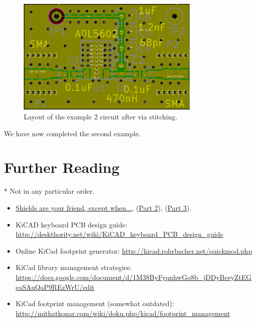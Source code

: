 \documentclass[12pt,letterpaper]{scrartcl}
\begin{document}
\begin{enumerate}
		\begin{figure}[ht]
			\centering
			\includegraphics[width=3.5in]{example2-layout-via}
			\caption{Layout of the example 2 circuit after via stitching.}
			\label{fig:example2-layout-via}
		\end{figure}
		
	\end{enumerate}

We have now completed the second example. 

\newpage
\section{Further Reading}

* Not in any particular order. 

\begin{itemize}
	\item \href{http://www.edn.com/electronics-blogs/the-practicing-instrumentation-engineer/4418080/2/Shields-are-your-friend--except-when-}{Shields are your friend, except when...}, (\href{http://www.edn.com/electronics-blogs/the-practicing-instrumentation-engineer/4419228/2/Shields-are-your-friend--except-when---Part-2-}{Part 2}), (\href{http://www.edn.com/electronics-blogs/the-practicing-instrumentation-engineer/4420553/Shields-are-your-friend--except-when---Part-3-}{Part 3}).
	
	\item KiCAD keyboard PCB design guide: \url{http://deskthority.net/wiki/KiCAD_keyboard_PCB_design_guide}{}

	\item Online KiCad footprint generator: \url{http://kicad.rohrbacher.net/quickmod.php}

	\item KiCad library management strategies: \url{https://docs.google.com/document/d/1M38ByFyqnhwGo8b_jDDyBceyZtEGeaSAuQaP9REzWrU/edit}

	\item KiCad footprint management (somewhat outdated):
\url{http://mithatkonar.com/wiki/doku.php/kicad/footprint_management}

\end{itemize}
\end{document}
